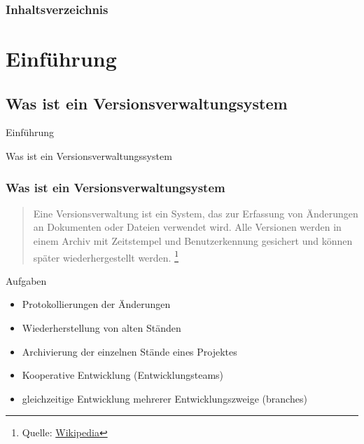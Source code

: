 \documentclass{beamer}
\begin{document}
\begin{frame}
\titlepage
\end{frame}

\begin{frame}
\frametitle{Inhaltsverzeichnis}
\tableofcontents[hidesubsections]
\end{frame}

\section{Einführung} 

\subsection{Was ist ein Versionsverwaltungsystem}
\begin{frame}[c]{Einführung}
\begin{center}
\begin{Huge}
Was ist ein Versionsverwaltungssystem
\end{Huge}
\end{center}
\end{frame}

\begin{frame}\frametitle{Was ist ein Versionsverwaltungsystem} 
\begin{quote}
Eine Versionsverwaltung ist ein System, das zur Erfassung von Änderungen an Dokumenten oder Dateien verwendet wird. Alle Versionen werden in einem Archiv mit Zeitstempel und Benutzerkennung gesichert und können später wiederhergestellt werden.
\footnote{Quelle: \href{http://de.wikipedia.org/wiki/Versionsverwaltung}{Wikipedia}}
\end{quote} 

Aufgaben
\begin{itemize}
\item  Protokollierungen der Änderungen
\item  Wiederherstellung von alten Ständen 
\item  Archivierung der einzelnen Stände eines Projektes
\item  Kooperative Entwicklung (Entwicklungsteams)
\item  gleichzeitige Entwicklung mehrerer Entwicklungszweige (branches)
\end{itemize} 
\end{frame}
\end{document}
